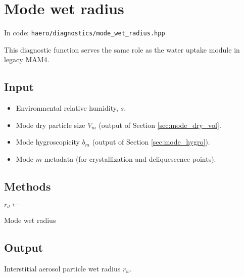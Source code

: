 \section{Mode wet radius}

In code: \texttt{haero/diagnostics/mode\_wet\_radius.hpp}

This diagnostic function serves the same role as the water uptake module in legacy MAM4.

\subsection{Input}
  \begin{itemize}
    \item Environmental relative humidity, $s$.
    \item Mode dry particle size $V_m$ (output of Section \ref{sec:mode_dry_vol}.
    \item Mode hygroscopicity $b_m$ (output of Section \ref{sec:mode_hygro}).
    \item Mode $m$ metadata (for crystallization and deliquescence points).
  \end{itemize}

\subsection{Methods}

\begin{algorithm}[H]
\DontPrintSemicolon
$r_d\gets$  
\caption{Mode wet radius} 
\end{algorithm}



\subsection{Output}

Interstitial aerosol particle wet radius $r_w$.